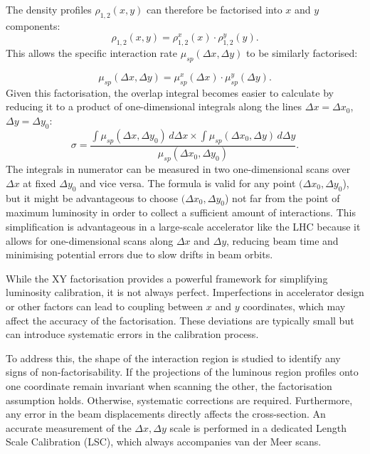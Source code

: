 The density profiles $\rho _{1,2}(x, y)$ can therefore be factorised into $x$ and $y$ components:
\begin{equation}
\rho _{1,2}(x, y) = \rho _{1,2}^x(x) \cdot \rho _{1,2}^y(y).
\end{equation}
This allows the specific interaction rate $\mu_{sp}(\Delta x, \Delta y)$ to be similarly factorised:

\begin{equation}
\mu _{sp}(\Delta x, \Delta y) = \mu ^x_{sp}(\Delta x) \cdot \mu ^y_{sp}(\Delta y).
\end{equation}
Given this factorisation, the overlap integral becomes easier to calculate by reducing it to a product of one-dimensional integrals  along the lines $\Delta x = \Delta x_0$, $\Delta y = \Delta y_0$:
\begin{equation}
\sigma = \frac{\int \mu _{sp}(\Delta x, \Delta y_0)\, d\Delta x \times \int \mu _{sp}(\Delta x_0, \Delta y)\, d\Delta y}{\mu _{sp}(\Delta x_0, \Delta y_0)}.\label{definition_sigma_vdm}
\end{equation}
The integrals in numerator can be measured in two one-dimensional scans over $\Delta x$ at fixed $\Delta y_0$ and vice versa. The formula is valid for any point $(\Delta x_0, \Delta y_0$), but it might be advantageous to choose $(\Delta x_0, \Delta y_0$) not far from the point of maximum luminosity in order to collect a sufficient amount of interactions. This simplification is advantageous in a large-scale accelerator like the LHC because it allows for one-dimensional scans along $\Delta x$ and $\Delta y$, reducing beam time and minimising potential errors due to slow drifts in beam orbits. 

While the XY factorisation provides a powerful framework for simplifying luminosity calibration, it is not always perfect. Imperfections in accelerator design or other factors can lead to coupling between $x$ and $y$ coordinates, which may affect the accuracy of the factorisation. These deviations are typically small but can introduce systematic errors in the calibration process.

To address this, the shape of the interaction region is studied to identify any signs of non-factorisability. If the projections of the luminous region profiles onto one coordinate remain invariant when scanning the other, the factorisation assumption holds. Otherwise, systematic corrections are required. Furthermore, any error in the beam displacements directly affects the cross-section. An accurate measurement of the $\Delta x, \Delta y$ scale is performed in a dedicated Length Scale Calibration (LSC), which always accompanies van der Meer scans. 

